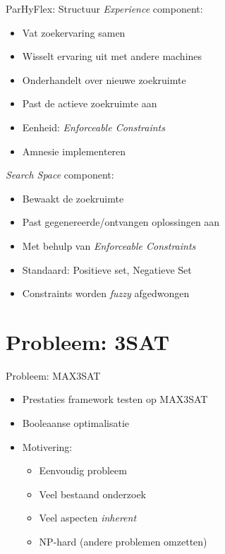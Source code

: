 \documentclass[handout]{beamer}
\begin{document}
\begin{frame}{ParHyFlex: Structuur}
\emph{Experience} component:
\begin{itemize}[<+->]
 \item Vat zoekervaring samen
 \item Wisselt ervaring uit met andere machines
 \item Onderhandelt over nieuwe zoekruimte
 \item Past de actieve zoekruimte aan
 \item Eenheid: \emph{Enforceable Constraints}
 \item Amnesie implementeren
\end{itemize}
\emph{Search Space} component:
\begin{itemize}[<+->]
 \item Bewaakt de zoekruimte
 \item Past gegenereerde/ontvangen oplossingen aan
 \item Met behulp van \emph{Enforceable Constraints}
 \item Standaard: Positieve set, Negatieve Set
 \item Constraints worden \emph{fuzzy} afgedwongen
\end{itemize}
\end{frame}
\section{Probleem: 3SAT}
\begin{frame}{Probleem: MAX3SAT}
\begin{itemize}[<+->]
 \item Prestaties framework testen op MAX3SAT
 \item Booleaanse optimalisatie
 \item Motivering:
 \begin{itemize}[<+->]
  \item Eenvoudig probleem
  \item Veel bestaand onderzoek
  \item Veel aspecten \emph{inherent}
  \item NP-hard (andere problemen omzetten)
 \end{itemize}
\end{itemize}
\end{frame}
\end{document}
